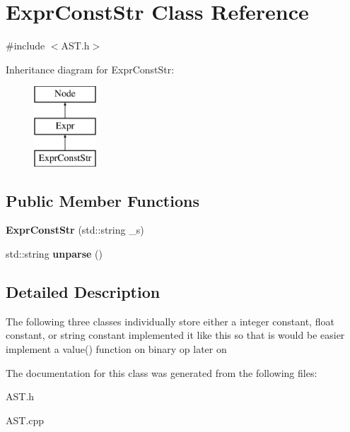 \hypertarget{classExprConstStr}{\section{Expr\-Const\-Str Class Reference}
\label{classExprConstStr}
}


{\ttfamily \#include $<$A\-S\-T.\-h$>$}

Inheritance diagram for Expr\-Const\-Str\-:\begin{figure}[H]
\begin{center}
\leavevmode
\includegraphics[height=3.000000cm]{classExprConstStr}
\end{center}
\end{figure}
\subsection*{Public Member Functions}
\begin{DoxyCompactItemize}
\item 
\hypertarget{classExprConstStr_af1c65d90e2bccd482f8f0b73b6225f74}{{\bfseries Expr\-Const\-Str} (std\-::string \-\_\-s)}\label{classExprConstStr_af1c65d90e2bccd482f8f0b73b6225f74}

\item 
\hypertarget{classExprConstStr_a13a5a43f7ccdcf01bac1681310d88141}{std\-::string {\bfseries unparse} ()}\label{classExprConstStr_a13a5a43f7ccdcf01bac1681310d88141}

\end{DoxyCompactItemize}


\subsection{Detailed Description}
The following three classes individually store either a integer constant, float constant, or string constant  implemented it like this so that is would be easier implement a value() function on binary op later on 

The documentation for this class was generated from the following files\-:\begin{DoxyCompactItemize}
\item 
A\-S\-T.\-h\item 
A\-S\-T.\-cpp\end{DoxyCompactItemize}
